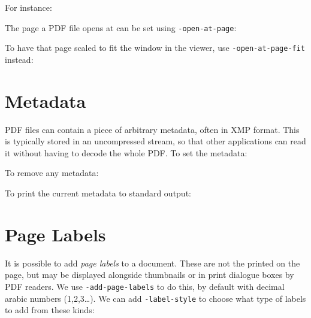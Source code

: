 \documentclass{book}
\begin{document}
  \noindent For instance:

\noindent{}

\noindent The page a PDF file opens at can be set using \texttt{-open-at-page}:

\noindent{}

\noindent To have that page scaled to fit the window in the viewer, use \texttt{-open-at-page-fit} instead:

\noindent{}


  \section{Metadata}
  PDF files can contain a piece of arbitrary metadata, often in XMP format.
This is typically stored in an uncompressed stream, so that other applications
can read it without having to decode the whole PDF. To set the metadata:

\noindent{}

  \noindent To remove any metadata:

\noindent{}

  \noindent To print the current metadata to standard output:

\noindent{}



\section{Page Labels}

It is possible to add \textit{page labels} to a document. These are not the printed on the page, but may be displayed alongside thumbnails or in print dialogue boxes by PDF readers. We use \texttt{-add-page-labels} to do this, by default with decimal arabic numbers (1,2,3\ldots). We can add \texttt{-label-style} to choose what type of labels to add from these kinds:
\end{document}
